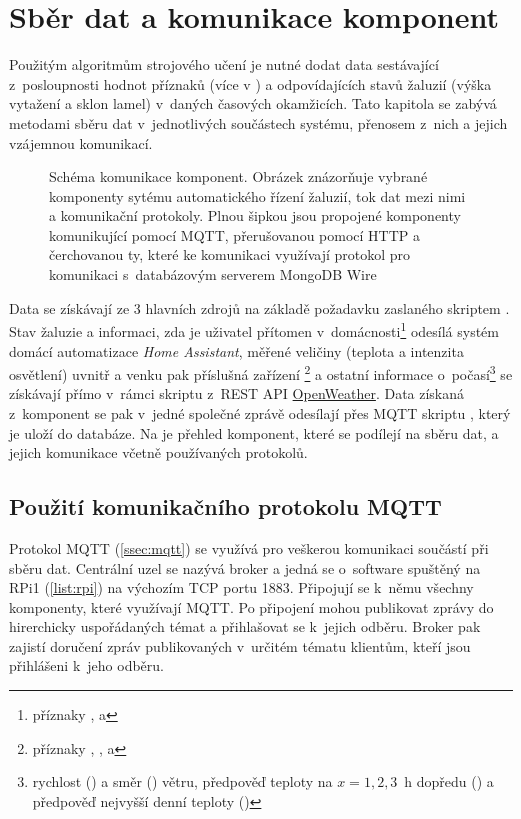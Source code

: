 \chapter{Sběr dat a komunikace komponent} \label{chap:dataCollection}
  Použitým algoritmům strojového učení je nutné dodat data sestávající z~posloupnosti hodnot příznaků (více v ) a odpovídajících stavů žaluzií (výška vytažení a sklon lamel) v~daných časových okamžicích. Tato kapitola se zabývá metodami sběru dat v~jednotlivých součástech systému, přenosem z~nich a jejich vzájemnou komunikací.
  
  \begin{figure}[H]
    \centering
    
    \caption[Schéma komunikace komponent]{Schéma komunikace komponent. Obrázek znázorňuje vybrané komponenty sytému automatického řízení žaluzií, tok dat mezi nimi a komunikační protokoly. Plnou šipkou jsou propojené komponenty komunikující pomocí MQTT, přerušovanou pomocí HTTP a čerchovanou ty, které ke komunikaci využívají protokol pro komunikaci s~databázovým serverem MongoDB Wire}
    \label{fig:comm}
  \end{figure}

  Data se získávají ze 3 hlavních zdrojů na základě požadavku zaslaného skriptem . Stav žaluzie a informaci, zda je uživatel přítomen v~domácnosti\footnote{příznaky ,  a } odesílá systém domácí automatizace \emph{Home Assistant}, měřené veličiny (teplota a intenzita osvětlení) uvnitř a venku pak příslušná zařízení \footnote{příznaky , ,  a } a ostatní informace o~počasí\footnote{rychlost () a směr () větru, předpověď teploty na $x=1,2,3$~h dopředu () a předpověď nejvyšší denní teploty ()} se získávají přímo v~rámci skriptu  z~REST API \href{https://openweathermap.org/}{OpenWeather}. Data získaná z~komponent se pak v~jedné společné zprávě odesílají přes MQTT skriptu , který je uloží do databáze. Na  je přehled komponent, které se podílejí na sběru dat, a jejich komunikace včetně používaných protokolů.
  \section{Použití komunikačního protokolu MQTT} \label{sec:MQTT}
    Protokol MQTT (\cref{ssec:mqtt}) se využívá pro veškerou komunikaci součástí při sběru dat. Centrální uzel se nazývá broker a jedná se o~software spuštěný na RPi1 (\cref{list:rpi}) na výchozím TCP portu 1883. Připojují se k~němu všechny komponenty, které využívají MQTT. Po připojení mohou publikovat zprávy do hirerchicky uspořádaných témat a přihlašovat se k~jejich odběru. Broker pak zajistí doručení zpráv publikovaných v~určitém tématu klientům, kteří jsou přihlášeni k~jeho odběru.
    
